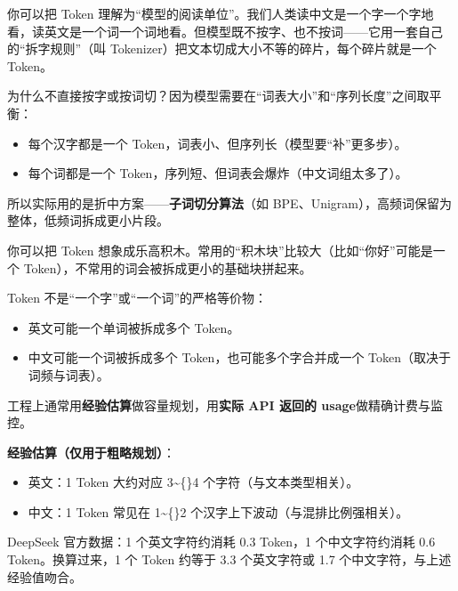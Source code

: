 \documentclass[10pt,a4paper]{ctexart}
\begin{document}
你可以把 Token 理解为“模型的阅读单位”。我们人类读中文是一个字一个字地看，读英文是一个词一个词地看。但模型既不按字、也不按词——它用一套自己的“拆字规则”（叫 Tokenizer）把文本切成大小不等的碎片，每个碎片就是一个 Token。



为什么不直接按字或按词切？因为模型需要在“词表大小”和“序列长度”之间取平衡：


\begin{itemize}[itemsep=2pt, topsep=4pt]
  \item 每个汉字都是一个 Token，词表小、但序列长（模型要“补”更多步）。
  \item 每个词都是一个 Token，序列短、但词表会爆炸（中文词组太多了）。
\end{itemize}


所以实际用的是折中方案——\textbf{子词切分算法}（如 BPE、Unigram），高频词保留为整体，低频词拆成更小片段。



你可以把 Token 想象成乐高积木。常用的“积木块”比较大（比如“你好”可能是一个 Token），不常用的词会被拆成更小的基础块拼起来。



Token 不是“一个字”或“一个词”的严格等价物：


\begin{itemize}[itemsep=2pt, topsep=4pt]
  \item 英文可能一个单词被拆成多个 Token。
  \item 中文可能一个词被拆成多个 Token，也可能多个字合并成一个 Token（取决于词频与词表）。
\end{itemize}


工程上通常用\textbf{经验估算}做容量规划，用\textbf{实际 API 返回的 usage}做精确计费与监控。



\textbf{经验估算（仅用于粗略规划）}：


\begin{itemize}[itemsep=2pt, topsep=4pt]
  \item 英文：1 Token 大约对应 3\textasciitilde\{\}4 个字符（与文本类型相关）。
  \item 中文：1 Token 常见在 1\textasciitilde\{\}2 个汉字上下波动（与混排比例强相关）。
\end{itemize}


DeepSeek 官方数据：1 个英文字符约消耗 0.3 Token，1 个中文字符约消耗 0.6 Token。换算过来，1 个 Token 约等于 3.3 个英文字符或 1.7 个中文字符，与上述经验值吻合。
\end{document}
